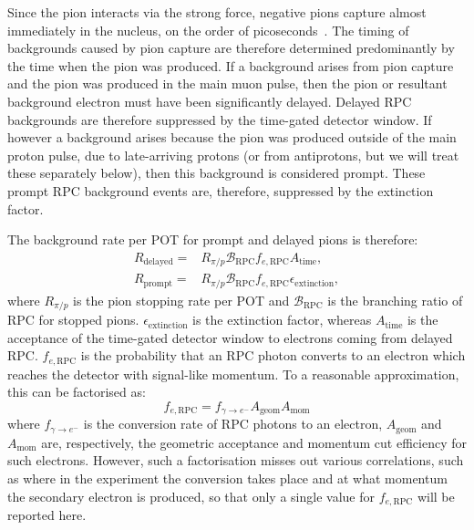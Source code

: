 Since the pion interacts via the strong force, negative pions capture almost immediately in the nucleus, on the order of picoseconds~\cite{Engelhardt:1975ct}.
The timing of backgrounds caused by pion capture are therefore determined predominantly by the time when the pion was produced.
If a background arises from pion capture and the pion was produced in the main muon pulse, then the pion or resultant background electron must have been significantly delayed.
Delayed \ac{RPC} backgrounds are therefore suppressed by the time-gated detector window.
If however a background arises because the pion was produced outside of the main proton pulse, due to late-arriving protons (or from antiprotons, but we will treat these separately below), then this background is considered prompt.
These prompt \ac{RPC} background events are, therefore, suppressed by the extinction factor.

The background rate per \ac{POT} for prompt and delayed pions is therefore:
\begin{align}
	R_\textrm{delayed}=&R_{\pi/p}\mathcal{B}_\textrm{RPC}f_{e,\textrm{RPC}}A_\textrm{time}, \\
	R_\textrm{prompt}=&R_{\pi/p}\mathcal{B}_\textrm{RPC}f_{e,\textrm{RPC}}\epsilon_\textrm{extinction},
\end{align}
where $R_{\pi/p}$ is the pion stopping rate per \ac{POT} and $\mathcal{B}_\textrm{RPC}$ is the branching ratio of \ac{RPC} for stopped pions.
$\epsilon_\textrm{extinction}$ is the extinction factor, whereas $A_\textrm{time}$ is the acceptance of the time-gated detector window to electrons coming from delayed RPC.
$f_{e,\textrm{RPC}}$ is the probability that an RPC photon converts to an electron which reaches the detector with signal-like momentum.
To a reasonable approximation, this can be factorised as:
\begin{equation}
f_{e,\textrm{RPC}}=f_{\gamma\rightarrow{}e^-}A_\textrm{geom}A_\textrm{mom}
\end{equation}
where $f_{\gamma\rightarrow{}e^-}$ is the conversion rate of RPC photons to an electron, $A_\textrm{geom}$ and $A_\textrm{mom}$
are, respectively, the geometric acceptance and momentum cut efficiency for such electrons.
However, such a factorisation misses out various correlations, such as where in the experiment the conversion takes place and at what momentum the secondary electron is produced, so that only a single value for $f_{e,\textrm{RPC}}$ will be reported here.

\FigRPCData
